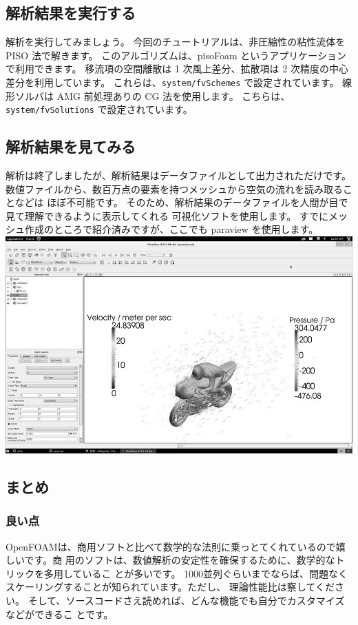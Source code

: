 \documentclass[mingoth,a4paper]{jsarticle}
\begin{document}
\subsection{解析結果を実行する}
解析を実行してみましょう。
今回のチュートリアルは、非圧縮性の粘性流体を PISO 法で解きます。
このアルゴリズムは、pisoFoam というアプリケーションで利用できます。
移流項の空間離散は 1 次風上差分、拡散項は 2 次精度の中心差分を利用しています。
これらは、\verb|system/fvSchemes| で設定されています。
線形ソルバは AMG 前処理ありの CG 法を使用します。
こちらは、\verb|system/fvSolutions| で設定されています。

\subsection{解析結果を見てみる}
解析は終了しましたが、解析結果はデータファイルとして出力されただけです。
数値ファイルから、数百万点の要素を持つメッシュから空気の流れを読み取ることなどは
ほぼ不可能です。
そのため、解析結果のデータファイルを人間が目で見て理解できるように表示してくれる
可視化ソフトを使用します。
すでにメッシュ作成のところで紹介済みですが、ここでも paraview を使用します。\\
\includegraphics[scale=0.5]{image201604/motorbike_velocity_and_pressure_mono.jpg}

\subsection{まとめ}

\subsubsection{良い点}
OpenFOAMは、商用ソフトと比べて数学的な法則に乗っとてくれているので嬉しいです。商
用のソフトは、数値解析の安定性を確保するために、数学的なトリックを多用しているこ
とが多いです。
1000並列ぐらいまでならば、問題なくスケーリングすることが知られています。ただし、
理論性能比は察してください。
そして、ソースコードさえ読めれば、どんな機能でも自分でカスタマイズなどができるこ
とです。
\end{document}
